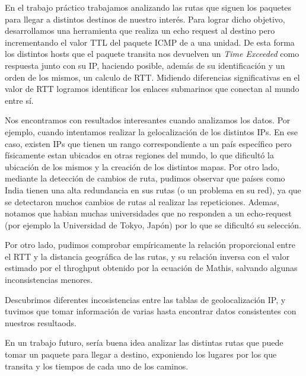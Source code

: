 En el trabajo práctico trabajamos analizando las rutas que siguen los paquetes para llegar a distintos destinos de nuestro interés. Para lograr dicho objetivo, desarrollamos una herramienta que realiza un echo request al destino pero incrementando el valor TTL del paquete ICMP de a una unidad. De esta forma los distintos hosts que el paquete transita nos devuelven un \textit{Time Exceeded} como respuesta junto con su IP, haciendo posible, además de su identificación y un orden de los mismos, un calculo de RTT. Midiendo diferencias significativas en el valor de RTT logramos identificar los enlaces submarinos que conectan al mundo entre sí.

Nos encontramos con resultados interesantes cuando analizamos los datos. Por ejemplo, cuando intentamos realizar la gelocalización de los distintos IPs. En ese caso, existen IPs que tienen un rango correspondiente a un país específico pero físicamente estan ubicados en otras regiones del mundo, lo que dificultó la ubicación de los mismos y la creación de los distintos mapas. Por otro lado, mediante la detección de cambios de ruta, pudimos observar que países como India tienen una alta redundancia en sus rutas (o un problema en su red), ya que se detectaron muchos cambios de rutas al realizar las repeticiones. Ademas, notamos que habian muchas universidades que no responden a un echo-request (por ejemplo la Universidad de Tokyo, Japón) por lo que se dificultó su selección.

Por otro lado, pudimos comprobar empíricamente la relación proporcional entre el RTT y la distancia geográfica de las rutas, y su relación inversa con el valor estimado por el throghput obtenido por la ecuación de Mathis, salvando algunas inconsistencias menores.

Descubrimos diferentes incosistencias entre las tablas de geolocalización IP, y tuvimos que tomar información de varias hasta encontrar datos consistentes con nuestros resultaods.

En un trabajo futuro, sería buena idea analizar las distintas rutas que puede tomar un paquete para llegar a destino, exponiendo los lugares por los que transita y los tiempos de cada uno de los caminos.